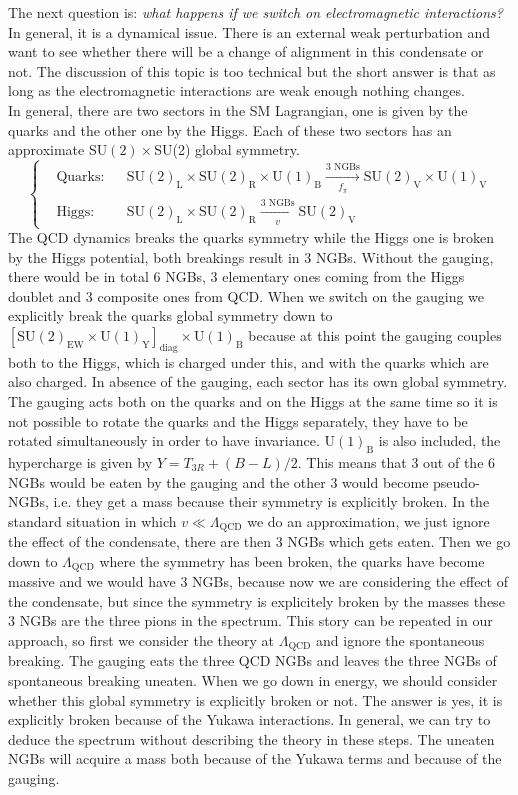 \documentclass[../main.tex]{subfiles}
\begin{document}
The next question is: \textit{what happens if we switch on electromagnetic interactions?} In general, it is a dynamical issue. There is an external weak perturbation and want to see whether there will be a change of alignment in this condensate or not. The discussion of this topic is too technical but the short answer is that as long as the electromagnetic interactions are weak enough nothing changes.\\
In general, there are two sectors in the SM Lagrangian, one is given by the quarks and the other one by the Higgs. Each of these two sectors has an approximate SU$(2)\times$SU(2) global symmetry. 
\[
\left\{
\begin{aligned}
&\text{Quarks:}&&\text{SU}(2)_{\text{L}}\times\text{SU}(2)_{\text{R}}\times\text{U}(1)_{\text{B}}\xrightarrow[f_\pi]{\text{3 NGBs}}\text{SU}(2)_{\text{V}}\times\text{U}(1)_{\text{V}}\\
&\text{Higgs:}&&\text{SU}(2)_{\text{L}}\times\text{SU}(2)_{\text{R}}\xrightarrow[v]{\text{3 NGBs}}\text{SU}(2)_{\text{V}}
\end{aligned}
\right.
\]
The QCD dynamics breaks the quarks symmetry while the Higgs one is broken by the Higgs potential, both breakings result in 3 NGBs. Without the gauging, there would be in total 6 NGBs, 3 elementary ones coming from the Higgs doublet and 3 composite ones from QCD. When we switch on the gauging we explicitly break the quarks global symmetry down to $[\text{SU}(2)_{\text{EW}}\times\text{U}(1)_{\text{Y}}]_{\text{diag}}\times\text{U}(1)_{\text{B}}$ because at this point the gauging couples both to the Higgs, which is charged under this, and with the quarks which are also charged. In absence of the gauging, each sector has its own global symmetry. The gauging acts both on the quarks and on the Higgs at the same time so it is not possible to rotate the quarks and the Higgs separately, they have to be rotated simultaneously in order to have invariance. $\text{U}(1)_{\text{B}}$ is also included, the hypercharge is given by $Y=T_{3R}+(B-L)/2$. This means that 3 out of the 6 NGBs would be eaten by the gauging and the other 3 would become pseudo-NGBs, i.e. they get a mass because their symmetry is explicitly broken. In the standard situation in which $v\ll\Lambda_{\text{QCD}}$ we do an approximation, we just ignore the effect of the condensate, there are then 3 NGBs which gets eaten. Then we go down to $\Lambda_{\text{QCD}}$ where the symmetry has been broken, the quarks have become massive and we would have 3 NGBs, because now we are considering the effect of the condensate, but since the symmetry is explicitely broken by the masses these 3 NGBs are the three pions in the spectrum. This story can be repeated in our approach, so first we consider the theory at $\Lambda_{\text{QCD}}$ and ignore the spontaneous breaking. The gauging eats the three QCD NGBs and leaves the three NGBs of spontaneous breaking uneaten. When we go down in energy, we should consider whether this global symmetry is explicitly broken or not. The answer is yes, it is explicitly broken because of the Yukawa interactions. In general, we can try to deduce the spectrum without describing the theory in these steps. The uneaten NGBs will acquire a mass both because of the Yukawa terms and because of the gauging.\\
\end{document}
